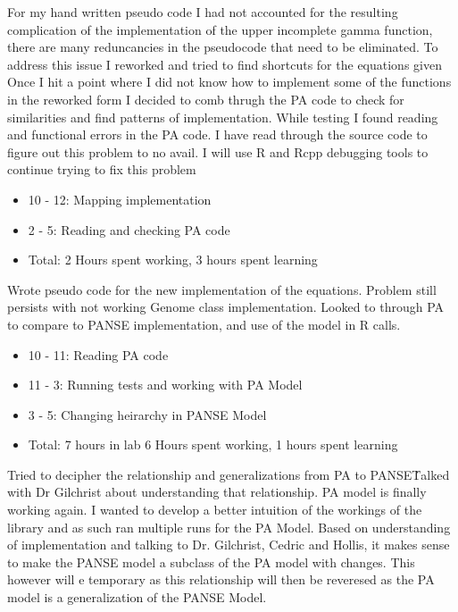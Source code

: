 \documentclass[12pt,hyperref]{labbook}
\begin{document}
For my hand written pseudo code I had not accounted for the resulting complication of the implementation of the upper incomplete gamma function, there are many reduncancies in the pseudocode that need to be eliminated. To address this issue I reworked and tried to find shortcuts for the equations given
Once I hit a point where I did not know how to implement some of the functions in the reworked form I decided to comb thrugh the PA code to check for similarities and find patterns of implementation. While testing I found reading and functional errors in the PA code. I have read through the source code to figure out this problem to no avail. I will use R and Rcpp debugging tools to continue trying to fix this problem
\begin{itemize}
    \item 10 - 12: Mapping implementation
    \item 2 - 5: Reading and checking PA code
    \item Total: 2 Hours spent working, 3 hours spent learning
\end{itemize}
Wrote pseudo code for the new implementation of the equations.
Problem still persists with not working Genome class implementation. Looked to through PA to compare to PANSE implementation, and use of the model in R calls.
\begin{itemize}
    \item 10 - 11: Reading PA code
    \item 11 - 3: Running tests and working with PA Model
    \item 3 - 5: Changing heirarchy in PANSE Model
    \item Total: 7 hours in lab 6 Hours spent working, 1 hours spent learning
\end{itemize}
Tried to decipher the relationship and generalizations from PA to PANSE\. Talked with Dr Gilchrist about understanding that relationship.
PA model is finally working again. I wanted to develop a better intuition of the workings of the library and as such ran multiple runs for the PA Model.
Based on understanding of implementation and talking to Dr. Gilchrist, Cedric and Hollis, it makes sense to make the PANSE model a subclass of the PA model with changes. This however will e temporary as this relationship will then be reveresed as the PA model is a generalization of the PANSE Model.
\end{document}
